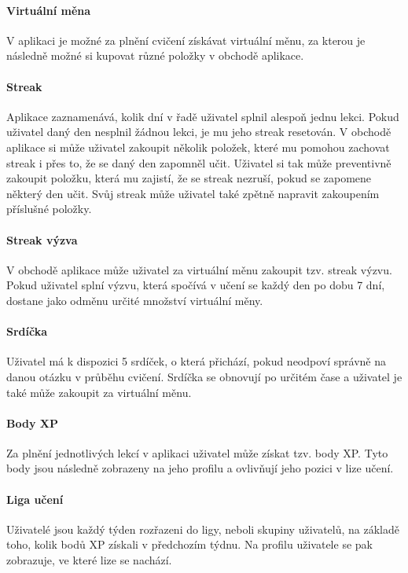 \paragraph{Virtuální měna} V aplikaci je možné za plnění cvičení získávat virtuální měnu, za kterou je následně možné si kupovat různé položky v obchodě aplikace.

\paragraph{Streak} Aplikace zaznamenává, kolik dní v řadě uživatel splnil alespoň jednu lekci. Pokud uživatel daný den nesplnil žádnou lekci, je mu jeho streak resetován. V obchodě aplikace si může uživatel zakoupit několik položek, které mu pomohou zachovat streak i přes to, že se daný den zapomněl učit. Uživatel si tak může preventivně zakoupit položku, která mu zajistí, že se streak nezruší, pokud se zapomene některý den učit. Svůj streak může uživatel také zpětně napravit zakoupením příslušné položky.

\paragraph{Streak výzva} V obchodě aplikace může uživatel za virtuální měnu zakoupit tzv. streak výzvu. Pokud uživatel splní výzvu, která spočívá v učení se každý den po dobu 7 dní, dostane jako odměnu určité množství virtuální měny.

\paragraph{Srdíčka} Uživatel má k dispozici 5 srdíček, o která přichází, pokud neodpoví správně na danou otázku v průběhu cvičení. Srdíčka se obnovují po určitém čase a uživatel je také může zakoupit za virtuální měnu.

\paragraph{Body XP} Za plnění jednotlivých lekcí v aplikaci uživatel může získat tzv. body XP. Tyto body jsou následně zobrazeny na jeho profilu a ovlivňují jeho pozici v lize učení. 

\paragraph{Liga učení} Uživatelé jsou každý týden rozřazeni do ligy, neboli skupiny uživatelů, na základě toho, kolik bodů XP získali v předchozím týdnu. Na profilu uživatele se pak zobrazuje, ve které lize se nachází.  

